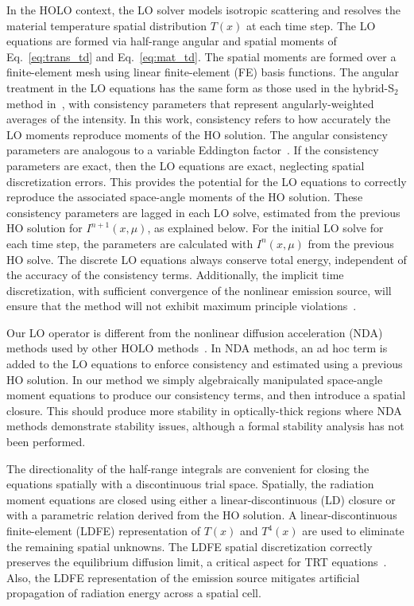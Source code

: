 In the HOLO context, the LO solver models isotropic scattering and
resolves the material temperature spatial distribution $T(x)$ at each time step.  The LO equations are formed via half-range 
angular and spatial moments of
Eq.~\eqref{eq:trans_td} and Eq.~\eqref{eq:mat_td}. 
The spatial moments are formed over a
finite-element mesh using linear finite-element (FE) basis functions.   The angular treatment in the LO equations has the same form as those
used in the hybrid-S$_2$ method in~\cite{wolters},  with consistency parameters that
represent angularly-weighted averages of the intensity.  In this work, consistency refers
to how accurately the LO moments reproduce moments of the HO solution.
The angular consistency parameters
are analogous to a variable Eddington factor~\cite{chandrasekhar}.  If the consistency parameters are exact, then the LO
equations are exact, neglecting spatial discretization errors.  This provides the
potential for the LO equations to correctly reproduce the associated space-angle
moments of the HO solution. These consistency
parameters are lagged in each LO solve, estimated from the previous HO solution for
$I^{n+1}(x,\mu)$, as explained below. For the initial LO solve for each time step, the
parameters are calculated with $I^{n}(x,\mu)$ from the previous HO solve.  The discrete LO equations always conserve
total energy, independent of the accuracy of the consistency terms. 
Additionally, the
implicit time discretization, with sufficient convergence of the nonlinear emission
source, will ensure that the method will not exhibit maximum principle
violations~\cite{larsen_mpv}.

Our LO operator is different from the nonlinear
diffusion acceleration (NDA) methods used by other HOLO methods~\cite{rmc,park,willert}.  In
NDA methods, an ad hoc term is added to the LO equations to enforce consistency and estimated using a
previous HO solution.  In our method we simply algebraically 
manipulated space-angle moment equations to produce our consistency terms, and then
introduce a spatial closure. This should produce more
stability in optically-thick regions where NDA methods demonstrate stability issues,
although a formal stability analysis has not been performed.

The directionality of the half-range integrals are convenient for closing the equations
spatially with a discontinuous trial space.  Spatially, the radiation moment
equations are closed using either a linear-discontinuous (LD) closure or with a
parametric relation derived from the HO solution.  A linear-discontinuous
finite-element (LDFE) representation of $T(x)$
and $T^4(x)$ are used to eliminate the remaining spatial unknowns.
The LDFE spatial discretization correctly preserves the equilibrium diffusion limit, a
critical aspect for TRT equations~\cite{larsen_edl,morel_ldtrt}. Also, the LDFE
representation of the emission source mitigates artificial propagation of radiation
energy across a spatial cell.

